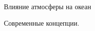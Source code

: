 \begin{chapter}{Влияние атмосферы на океан}
\begin{section}{Современные концепции.}
%
\end{section}
\end{chapter}
